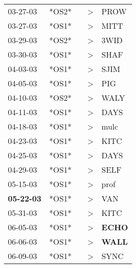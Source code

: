 \begin{supertabular}{p{0.07\textwidth}p{0.06\textwidth}p{0.02\textwidth}p{0.02\textwidth}p{0.06\textwidth}}
          03-27-03\textsuperscript{} &  *OS2* &   &     \textgreater &           PROW\textsuperscript{} \\
          03-27-03\textsuperscript{} &  *OS1* &   &     \textgreater &           MITT\textsuperscript{} \\
          03-29-03\textsuperscript{} &  *OS2* &   &     \textgreater &           3WID\textsuperscript{} \\
          03-30-03\textsuperscript{} &  *OS1* &   &     \textgreater &           SHAF\textsuperscript{} \\
          04-03-03\textsuperscript{} &  *OS1* &   &     \textgreater &           SJIM\textsuperscript{} \\
          04-05-03\textsuperscript{} &  *OS1* &   &     \textgreater &            PIG\textsuperscript{} \\
          04-10-03\textsuperscript{} &  *OS2* &   &     \textgreater &           WALY\textsuperscript{} \\
          04-11-03\textsuperscript{} &  *OS1* &   &     \textgreater &           DAYS\textsuperscript{} \\
          04-18-03\textsuperscript{} &  *OS1* &   &     \textgreater &           mulc\textsuperscript{} \\
          04-23-03\textsuperscript{} &  *OS1* &   &     \textgreater &           KITC\textsuperscript{} \\
          04-25-03\textsuperscript{} &  *OS1* &   &     \textgreater &           DAYS\textsuperscript{} \\
          04-29-03\textsuperscript{} &  *OS1* &   &     \textgreater &           SELF\textsuperscript{} \\
          05-15-03\textsuperscript{} &  *OS1* &   &     \textgreater &           prof\textsuperscript{} \\
 \textbf{05-22-03\textsuperscript{}} &  *OS1* &   &     \textgreater &            VAN\textsuperscript{} \\
          05-31-03\textsuperscript{} &  *OS1* &   &     \textgreater &           KITC\textsuperscript{} \\
          06-05-03\textsuperscript{} &  *OS1* &   &     \textgreater &  \textbf{ECHO\textsuperscript{}} \\
          06-06-03\textsuperscript{} &  *OS1* &   &     \textgreater &  \textbf{WALL\textsuperscript{}} \\
          06-09-03\textsuperscript{} &  *OS1* &   &     \textgreater &           SYNC\textsuperscript{} \\

\end{supertabular}
